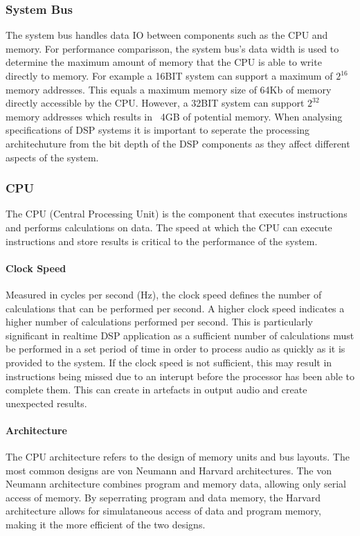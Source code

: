 \documentclass{scrartcl}
\begin{document}
    \subsubsection{System Bus}
    The system bus handles data IO between components such as the CPU
    and memory. For performance comparisson, the system bus's data width is
    used to determine the maximum amount of memory that the CPU is able to
    write directly to memory. 
    For example a 16BIT system can support a maximum of $2^{16}$ memory
    addresses. This equals a maximum memory size of 64Kb of memory directly
    accessible by the CPU. However, a 32BIT system can support $2^{32}$ memory
    addresses which results in ~4GB of potential memory.
    When analysing specifications of DSP systems it is important to seperate
    the processing architechuture from the bit depth of the DSP components as
    they affect different aspects of the system.


    \subsubsection{CPU}\label{CPU}
    The CPU (Central Processing Unit) is the component that executes
    instructions and performs calculations on data. The speed at which the CPU
    can execute instructions and store results is critical to the performance
    of the system.

    \paragraph{Clock Speed}
    Measured in cycles per second (Hz), the clock speed defines the number of
    calculations that can be performed per second. A higher clock speed
    indicates a higher number of calculations performed per second. This is
    particularly significant in realtime DSP application as a sufficient number
    of calculations must be performed in a set period of time in order to
    process audio as quickly as it is provided to the system.  If the clock
    speed is not sufficient, this may result in instructions being missed due
    to an interupt before the processor has been able to complete them. This
    can create in artefacts in output audio and create unexpected results.

    \paragraph{Architecture}
    The CPU architecture refers to the design of memory units and bus layouts.
    The most common designs are von Neumann and Harvard architectures. The von
    Neumann architecture combines program and memory data, allowing only serial
    access of memory. By seperrating program and data memory, the Harvard
    architecture allows for simulataneous access of data and program memory,
    making it the more efficient of the two designs.
    
\end{document}
